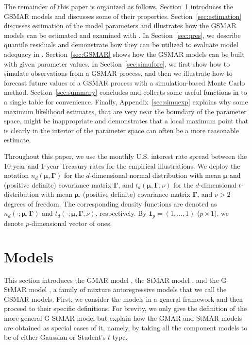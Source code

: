 \documentclass[nojss]{jss} %
\begin{document}
The remainder of this paper is organized as follows. Section~\ref{sec:models} introduces the GSMAR models and discusses some of their properties. Section~\ref{sec:estimation} discusses estimation of the model parameters and illustrates how the GSMAR models can be estimated and examined with . In Section~\ref{sec:qres}, we describe quantile residuals and demonstrate how they can be utilized to evaluate model adequacy in . Section~\ref{sec:GSMAR} shows how the GSMAR models can be built with given parameter values. In Section~\ref{sec:simufore}, we first show how to simulate observations from a GSMAR process, and then we illustrate how to forecast future values of a GSMAR process with a simulation-based Monte Carlo method. Section~\ref{sec:summary} concludes and collects some useful functions in  to a single table for convenience. Finally, Appendix~\ref{sec:simuexp} explains why some maximum likelihood estimates, that are very near the boundary of the parameter space, might be inappropriate and demonstrates that a local maximum point that is clearly in the interior of the parameter space can often be a more reasonable estimate.

Throughout this paper, we use the monthly U.S. interest rate spread between the 10-year and 1-year Treasury rates for the empirical illustrations. We deploy the notation $n_d(\boldsymbol{\mu},\boldsymbol{\Gamma})$ for the $d$-dimensional normal distribution with mean $\boldsymbol{\mu}$ and (positive definite) covariance matrix $\boldsymbol{\Gamma}$, and $t_d(\boldsymbol{\mu},\boldsymbol{\Gamma},\nu)$ for the $d$-dimensional $t$-distribution with mean $\boldsymbol{\mu}$, (positive definite) covariance matrix $\boldsymbol{\Gamma}$, and $\nu>2$ degrees of freedom. The corresponding density functions are denoted as $n_d(\cdot;\boldsymbol{\mu},\boldsymbol{\Gamma})$ and $t_d(\cdot;\boldsymbol{\mu},\boldsymbol{\Gamma},\nu)$, respectively. By $\boldsymbol{1}_p=(1,...,1)$ ($p \times 1$), we denote $p$-dimensional vector of ones.



\section{Models}\label{sec:models}
This section introduces the GMAR model \citep{Kalliovirta+Meitz+Saikkonen:2015}, the StMAR model \citep{Meitz+Preve+Saikkonen:2021}, and the G-StMAR model \citep{Virolainen:2020}, a family of mixture autoregressive models that we call the GSMAR models. First, we consider the models in a general framework and then proceed to their specific definitions. For brevity, we only give the definition of the more general G-StMAR model but explain how the GMAR and StMAR models are obtained as special cases of it, namely, by taking all the component models to be of either Gaussian or Student's $t$ type.
\end{document}
